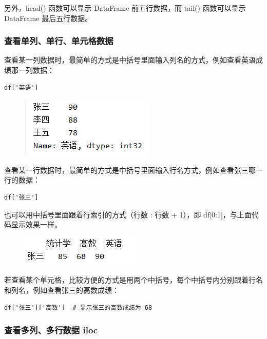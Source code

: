 另外，head() 函数可以显示 DataFrame 前五行数据，而 tail() 函数可以显示 DataFrame 最后五行数据。

\subsubsection{查看单列、单行、单元格数据}

查看某一列数据时，最简单的方式是中括号里面输入列名的方式，例如查看英语成绩那一列数据：
\begin{lstlisting}[Language=Python]
df['英语']
\end{lstlisting}

\begin{figure}[!ht]
\centering
  \includegraphics[scale=0.8]{figure/chapter2/pandas5.png}
\end{figure}

查看某一行数据时，最简单的方式是中括号里面输入行名方式，例如查看张三哪一行的数据：
\begin{lstlisting}[Language=Python]
df['张三']
\end{lstlisting}

也可以用中括号里面跟着行索引的方式（行数 : 行数 + 1），即 df[0:1]，与上面代码显示效果一样。


\begin{figure}[!ht]
\centering
  \includegraphics[scale=0.8]{figure/chapter2/pandas6.png}
\end{figure}


若查看某个单元格，比较方便的方式是用两个中括号，每个中括号内分别跟着行名和列名，例如查看张三的高数成绩：
\begin{lstlisting}[Language=Python]
df['张三']['高数']  # 显示张三的高数成绩为 68
\end{lstlisting}



\subsubsection{查看多列、多行数据 iloc}

